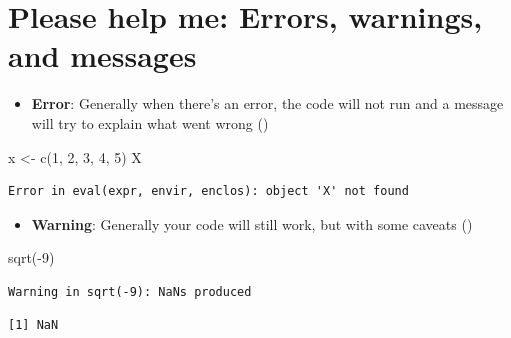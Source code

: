 \documentclass[
  ignorenonframetext,
]{beamer}
\newenvironment{Shaded}{\begin{snugshade}}{\end{snugshade}}
\newcommand{\DecValTok}[1]{\textcolor[rgb]{0.68,0.00,0.00}{#1}}
\newcommand{\FunctionTok}[1]{\textcolor[rgb]{0.28,0.35,0.67}{#1}}
\newcommand{\NormalTok}[1]{\textcolor[rgb]{0.00,0.23,0.31}{#1}}
\newcommand{\OtherTok}[1]{\textcolor[rgb]{0.00,0.23,0.31}{#1}}
\newcommand{\SpecialCharTok}[1]{\textcolor[rgb]{0.37,0.37,0.37}{#1}}
\providecommand{\tightlist}{%
  \setlength{\itemsep}{0pt}\setlength{\parskip}{0pt}}\usepackage{longtable,booktabs,array}
\begin{document}
\section{Please help me: Errors, warnings, and
messages}\label{please-help-me-errors-warnings-and-messages}

\begin{frame}[fragile]{}
\label{section-11}
\begin{itemize}
\tightlist
\item
  \textbf{Error}: Generally when there's an error, the code will not run
  and a message will try to explain what went wrong
  ()
\end{itemize}

\tiny

\begin{Shaded}
\begin{Highlighting}[]
\NormalTok{x }\OtherTok{\textless{}{-}} \FunctionTok{c}\NormalTok{(}\DecValTok{1}\NormalTok{, }\DecValTok{2}\NormalTok{, }\DecValTok{3}\NormalTok{, }\DecValTok{4}\NormalTok{, }\DecValTok{5}\NormalTok{)}
\NormalTok{X}
\end{Highlighting}
\end{Shaded}

\begin{verbatim}
Error in eval(expr, envir, enclos): object 'X' not found
\end{verbatim}

\normalsize

\begin{itemize}
\tightlist
\item
  \textbf{Warning}: Generally your code will still work, but with some
  caveats ()
\end{itemize}

\tiny

\begin{Shaded}
\begin{Highlighting}[]
\FunctionTok{sqrt}\NormalTok{(}\SpecialCharTok{{-}}\DecValTok{9}\NormalTok{)}
\end{Highlighting}
\end{Shaded}

\begin{verbatim}
Warning in sqrt(-9): NaNs produced
\end{verbatim}

\begin{verbatim}
[1] NaN
\end{verbatim}
\end{frame}
\end{document}
